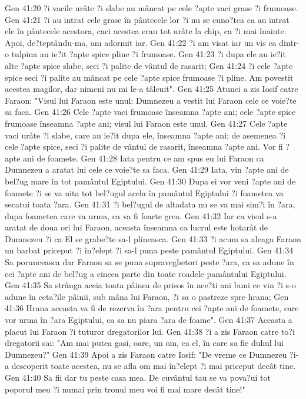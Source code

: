 Gen 41:20  ?i vacile urâte ?i slabe au mâncat pe cele ?apte vaci grase ?i frumoase.
Gen 41:21  ?i au intrat cele grase în pântecele lor ?i nu se cuno?tea ca au intrat ele în pântecele acestora, caci acestea erau tot urâte la chip, ca ?i mai înainte. Apoi, de?teptându-ma, am adormit iar.
Gen 41:22  ?i am visat iar un vis ca dintr-o tulpina au ie?it ?apte spice pline ?i frumoase.
Gen 41:23  ?i dupa ele au ie?it alte ?apte spice slabe, seci ?i palite de vântul de rasarit;
Gen 41:24  ?i cele ?apte spice seci ?i palite au mâncat pe cele ?apte spice frumoase ?i pline. Am povestit acestea magilor, dar nimeni nu mi le-a tâlcuit".
Gen 41:25  Atunci a zis Iosif catre Faraon: "Visul lui Faraon este unul: Dumnezeu a vestit lui Faraon cele ce voie?te sa faca.
Gen 41:26  Cele ?apte vaci frumoase înseamna ?apte ani; cele ?apte spice frumoase înseamna ?apte ani; visul lui Faraon este unul.
Gen 41:27  Cele ?apte vaci urâte ?i slabe, care au ie?it dupa ele, înseamna ?apte ani; de asemenea ?i cele ?apte spice, seci ?i palite de vântul de rasarit, înseamna ?apte ani. Vor fi ?apte ani de foamete.
Gen 41:28  Iata pentru ce am spus eu lui Faraon ca Dumnezeu a aratat lui cele ce voie?te sa faca.
Gen 41:29  Iata, vin ?apte ani de bel?ug mare în tot pamântul Egiptului.
Gen 41:30  Dupa ei vor veni ?apte ani de foamete ?i se va uita tot bel?ugul acela în pamântul Egiptului ?i foametea va secatui toata ?ara.
Gen 41:31  ?i bel?ugul de altadata nu se va mai sim?i în ?ara, dupa foametea care va urma, ca va fi foarte grea.
Gen 41:32  Iar ca visul s-a aratat de doua ori lui Faraon, aceasta înseamna ca lucrul este hotarât de Dumnezeu ?i ca El se grabe?te sa-l plineasca.
Gen 41:33  ?i acum sa aleaga Faraon un barbat priceput ?i în?elept ?i sa-l puna peste pamântul Egiptului.
Gen 41:34  Sa porunceasca dar Faraon sa se puna supraveghetori peste ?ara, ca sa adune în cei ?apte ani de bel?ug a cincea parte din toate roadele pamântului Egiptului.
Gen 41:35  Sa strânga aceia toata pâinea de prisos în ace?ti ani buni ce vin ?i s-o adune în ceta?ile pâinii, sub mâna lui Faraon, ?i sa o pastreze spre hrana;
Gen 41:36  Hrana aceasta va fi de rezerva în ?ara pentru cei ?apte ani de foamete, care vor urma în ?ara Egiptului, ca sa nu piara ?ara de foame".
Gen 41:37  Aceasta a placut lui Faraon ?i tuturor dregatorilor lui.
Gen 41:38  ?i a zis Faraon catre to?i dregatorii sai: "Am mai putea gasi, oare, un om, ca el, în care sa fie duhul lui Dumnezeu?"
Gen 41:39  Apoi a zis Faraon catre Iosif: "De vreme ce Dumnezeu ?i-a descoperit toate acestea, nu se afla om mai în?elept ?i mai priceput decât tine.
Gen 41:40  Sa fii dar tu peste casa mea. De cuvântul tau se va pova?ui tot poporul meu ?i numai prin tronul meu voi fi mai mare decât tine!"
